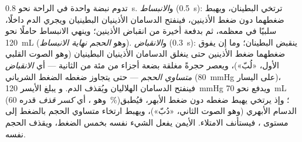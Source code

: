 \begin{proposition}\label{prop:b2:heart:cycle}
تدوم نبضة واحدة في الراحة نحو \qty{0.8}{s}. و\emph{الانبساط}
(\qty{0.5}{s}): ترتخي البطينان، ويهبط ضغطهما دون ضغط
الأذينين، فينفتح الدسامان الأذينيان البطينيان ويجري الدم داخلًا،
سلبيًا في معظمه، ثم بدفعة أخيرة من انقباض الأذينين؛
وينهي  الانبساط حاملًا نحو \qty{120}{mL} (وهو
\emph{الحجم نهاية الانبساط}). و\emph{الانقباض} (\qty{0.3}{s}):
ينقبض البطينان؛ وما إن يفوق ضغطهما ضغط
الأذينين حتى ينغلق الدسامان الأذينيان البطينيان (وهو الصوت القلبي الأول،
«لُبّ»)، ويعصر  حجرةً مغلقة بضعة أجزاء من مئة من الثانية
--- أي \emph{الانقباض متساوي الحجم} ---
حتى يتجاوز ضغطه الضغط الشرياني (\qty{80}{mmHg} على
اليسار)، فينفتح الدسامان الهلاليان ويُقذف الدم. و
يبلغ  الأيسر \qty{120}{mmHg} ويدفع نحو
\qty{70}{mL} (وهو \emph{}، أي \emph{كسر قذف}
قدره \qty{60}{\%})؛ وإذ يرتخي يهبط ضغطه دون ضغط
الأبهر، فيُطبق الدسام الأبهري (وهو الصوت الثاني، «دُبّ»)،
ويهبط ارتخاء متساوي الحجم بالضغط إلى مستوى
، فيستأنف الامتلاء.  الأيمن يفعل الشيء نفسه
بخمس الضغط، ويقذف الحجم نفسه.
\end{proposition}

